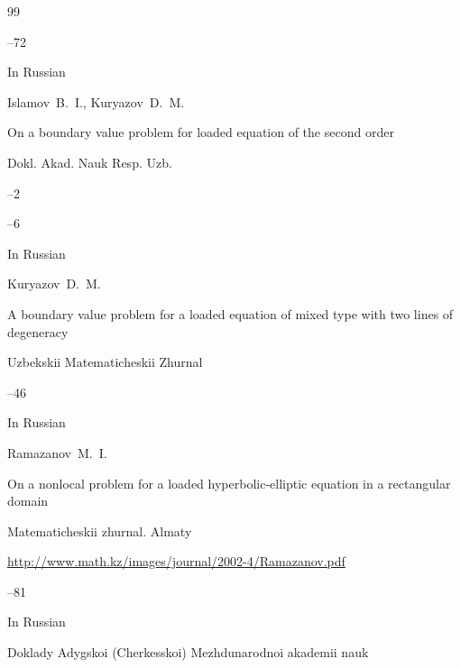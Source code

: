 \begin{thebibliography}{99}


--72






\lang In Russian

\by Islamov~B.~I., Kuryazov~D.~M.

\paper On a boundary value problem for loaded equation of the second order 

\jour Dokl. Akad. Nauk Resp. Uzb.


--2

--6




\lang In Russian

\by Kuryazov~D.~M.

\paper A boundary value problem for a loaded equation of mixed type with two lines of degeneracy

\jour Uzbekskii Matematicheskii Zhurnal



--46










\lang In Russian

\by Ramazanov~M.~I.

\paper On a nonlocal problem for a loaded hyperbolic-elliptic equation in a rectangular domain

\jour Matematicheskii zhurnal. Almaty

\elink \url{http://www.math.kz/images/journal/2002-4/Ramazanov.pdf}



--81







\lang In Russian

\jour Doklady Adygskoi (Cherkesskoi) Mezhdunarodnoi akademii nauk


\end{thebibliography}
